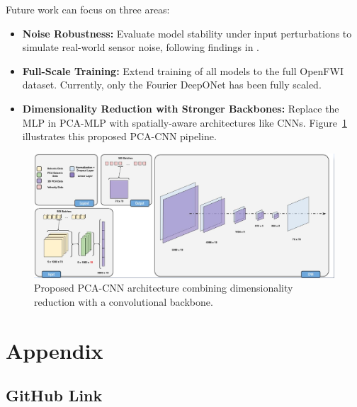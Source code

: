 \documentclass{article}
\newcommand{\instructions}[1]{{\color{blue} #1}}
\begin{document}
Future work can focus on three areas:
\begin{itemize}[leftmargin=*, itemsep=1pt, topsep=2pt]
    \item \textbf{Noise Robustness:} Evaluate model stability under input perturbations to simulate real-world sensor noise, following findings in \cite{fdonet}.
    \item \textbf{Full-Scale Training:} Extend training of all models to the full OpenFWI dataset. Currently, only the Fourier DeepONet has been fully scaled.
    \item \textbf{Dimensionality Reduction with Stronger Backbones:} Replace the MLP in PCA-MLP with spatially-aware architectures like CNNs. Figure~\ref{fig:conclusion1} illustrates this proposed PCA-CNN pipeline.
\end{itemize}

\begin{figure}[H]
    \centering
    \includegraphics[width=0.8\linewidth]{figures/conclusion1.png}
    \caption{Proposed PCA-CNN architecture combining dimensionality reduction with a convolutional backbone.}
    \label{fig:conclusion1}
\end{figure}

\newpage
\section*{Appendix}
\subsection*{GitHub Link}
\end{document}
